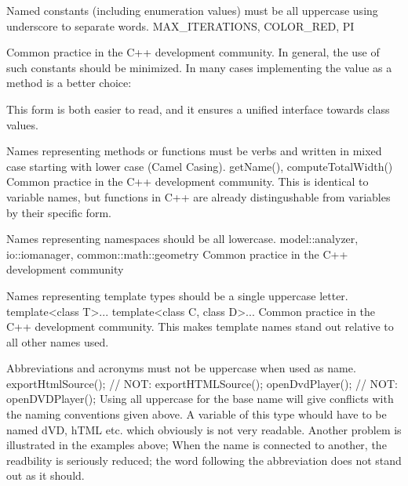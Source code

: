 \recommendation
{Named constants (including enumeration values) must be all uppercase using underscore to separate words.}
{MAX\_ITERATIONS, COLOR\_RED, PI}
{
	Common practice in the C++ development community. In general, the use of such constants should be minimized. In many cases implementing the value as a method is a better choice:

	
	
	This form is both easier to read, and it ensures a unified interface towards class values.
}

\recommendation
{Names representing methods or functions must be verbs and written in mixed case starting with lower case (Camel Casing).}
{getName(), computeTotalWidth()}
{Common practice in the C++ development community. This is identical to variable names, but functions in C++ are already distingushable from variables by their specific form.}

\recommendation
{Names representing namespaces should be all lowercase.}
{model::analyzer, io::iomanager, common::math::geometry}
{Common practice in the C++ development community}

\recommendation
{Names representing template types should be a single uppercase letter.}
{
	template\textless class T\textgreater ... \newline
	template\textless class C, class D\textgreater ...
}
{Common practice in the C++ development community. This makes template names stand out relative to all other names used.}

\recommendation
{Abbreviations and acronyms must not be uppercase when used as name.}
{
	exportHtmlSource(); // NOT: exportHTMLSource(); \newline
	openDvdPlayer();    // NOT: openDVDPlayer();
}
{Using all uppercase for the base name will give conflicts with the naming conventions given above. A variable of this type whould have to be named dVD, hTML etc. which obviously is not very readable. Another problem is illustrated in the examples above; When the name is connected to another, the readbility is seriously reduced; the word following the abbreviation does not stand out as it should.}

